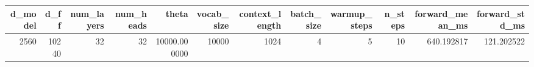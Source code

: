 \begin{tabular}{rrrrrrrrrrrr}
\toprule
d_model & d_ff & num_layers & num_heads & theta & vocab_size & context_length & batch_size & warmup_steps & n_steps & forward_mean_ms & forward_std_ms \\
\midrule
2560 & 10240 & 32 & 32 & 10000.000000 & 10000 & 1024 & 4 & 5 & 10 & 640.192817 & 121.202522 \\
\bottomrule
\end{tabular}
